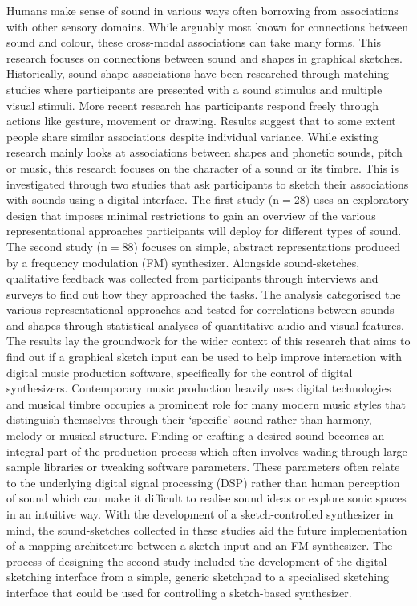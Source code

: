 \documentclass[]{interact}
\theoremstyle{plain}%
\theoremstyle{definition}
\theoremstyle{remark}
\begin{document}
Humans make sense of sound in various ways often borrowing from associations with other sensory domains. While arguably most known for connections between sound and colour, these cross-modal associations can take many forms. This research focuses on connections between sound and shapes in graphical sketches. Historically, sound-shape associations have been researched through matching studies where participants are presented with a sound stimulus and multiple visual stimuli. More recent research has participants respond freely through actions like gesture, movement or drawing. Results suggest that to some extent people share similar associations despite individual variance. While existing research mainly looks at associations between shapes and phonetic sounds, pitch or music, this research focuses on the character of a sound or its timbre. This is investigated through two studies that ask participants to sketch their associations with sounds using a digital interface. The first study (n$=$28) uses an exploratory design that imposes minimal restrictions to gain an overview of the various representational approaches participants will deploy for different types of sound. The second study (n$=$88) focuses on simple, abstract representations produced by a frequency modulation (FM) synthesizer. Alongside sound-sketches, qualitative feedback was collected from participants through interviews and surveys to find out how they approached the tasks. The analysis categorised the various representational approaches and tested for correlations between sounds and shapes through statistical analyses of quantitative audio and visual features. The results lay the groundwork for the wider context of this research that aims to find out if a graphical sketch input can be used to help improve interaction with digital music production software, specifically for the control of digital synthesizers. Contemporary music production heavily uses digital technologies and musical timbre occupies a prominent role for many modern music styles that distinguish themselves through their `specific' sound rather than harmony, melody or musical structure. Finding or crafting a desired sound becomes an integral part of the production process which often involves wading through large sample libraries or tweaking software parameters. These parameters often relate to the underlying digital signal processing (DSP) rather than human perception of sound which can make it difficult to realise sound ideas or explore sonic spaces in an intuitive way. With the development of a sketch-controlled synthesizer in mind, the sound-sketches collected in these studies aid the future implementation of a mapping architecture between a sketch input and an FM synthesizer. The process of designing the second study included the development of the digital sketching interface from a simple, generic sketchpad to a specialised sketching interface that could be used for controlling a sketch-based synthesizer.
\end{document}
